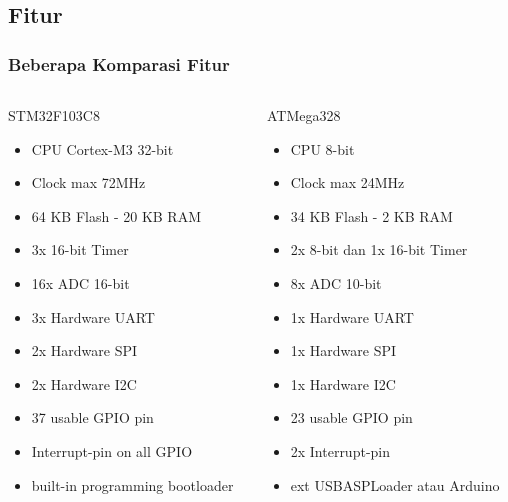 \documentclass[table,dvipsnames]{beamer}
\begin{document}
	\subsection{Fitur}
	\begin{frame}
		\frametitle{Beberapa Komparasi Fitur}
		\begin{columns}[T]
			\begin{column}{.48\textwidth}
				STM32F103C8
				\begin{itemize}
					\item CPU Cortex-M3 32-bit
					\item Clock max 72MHz
					\item 64 KB Flash - 20 KB RAM
					\item 3x 16-bit Timer
					\item 16x ADC 16-bit
					\item 3x Hardware UART
					\item 2x Hardware SPI
					\item 2x Hardware I2C
					\item 37 usable GPIO pin
					\item Interrupt-pin on all GPIO
					\item built-in programming bootloader
				\end{itemize}
			\end{column}
			\begin{column}{.48\textwidth}
				ATMega328
				\begin{itemize}
					\item CPU 8-bit
					\item Clock max 24MHz
					\item 34 KB Flash - 2 KB RAM
					\item 2x 8-bit dan 1x 16-bit Timer
					\item 8x ADC 10-bit
					\item 1x Hardware UART
					\item 1x Hardware SPI
					\item 1x Hardware I2C
					\item 23 usable GPIO pin
					\item 2x Interrupt-pin
					\item ext USBASPLoader atau Arduino
				\end{itemize}
			\end{column}
		\end{columns}
	\end{frame}
\end{document}
